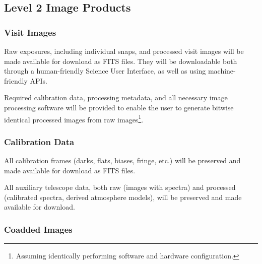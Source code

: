 \documentclass[12pt]{article}
\begin{document}
\subsection{Level 2 Image Products}

\subsubsection{Visit Images}

Raw exposures, including individual snaps, and processed visit images will be made available for download as FITS files. They will be downloadable both through a human-friendly Science User Interface, as well as using machine-friendly APIs.

Required calibration data, processing metadata, and all necessary image processing software will be provided to enable the user to generate bitwise identical processed images from raw images\footnote{Assuming identically performing software and hardware configuration.}.

\subsubsection{Calibration Data}

All calibration frames (darks, flats, biases, fringe, etc.) will be preserved and made available for download as FITS files.

All auxiliary telescope data, both raw (images with spectra) and processed (calibrated spectra, derived atmosphere models), will be preserved and made available for download.

\subsubsection{Coadded Images}
\label{sec:coadds}
\end{document}

